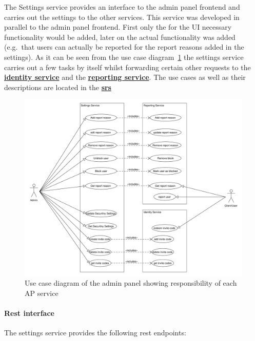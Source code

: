 The Settings service provides an interface to the admin panel frontend and carries out the settings to the other
services.
This service was developed in parallel to the admin panel frontend. %
First only the for the UI necessary functionality would be added, later on the actual functionality was added
(e.g.\ that users can actually be reported for the report reasons added in the settings).
As it can be seen from the use case diagram~\ref{fig:ucd} the settings service carries out a few tasks by itself whilst
forwarding certain other requests to the \hyperref[subsubsec:identitySer]{\textbf{identity service}} and the
\hyperref[subsubsec:reportingSer]{\textbf{reporting service}}.
The use cases as well as their descriptions are located in the
\hyperref[ch:software-requirements-specification-(srs)]{\textbf{\ac{srs}}}

\begin{figure}[!ht]
    \centering
    \includegraphics[width=1.0\textwidth]{./images/UseCaseDiagramAdminPanel}
    \caption{Use case diagram of the admin panel showing responsibility of each AP service}
    \label{fig:ucd}
\end{figure}

\paragraph{Rest interface}

The settings service provides the following rest endpoints:

